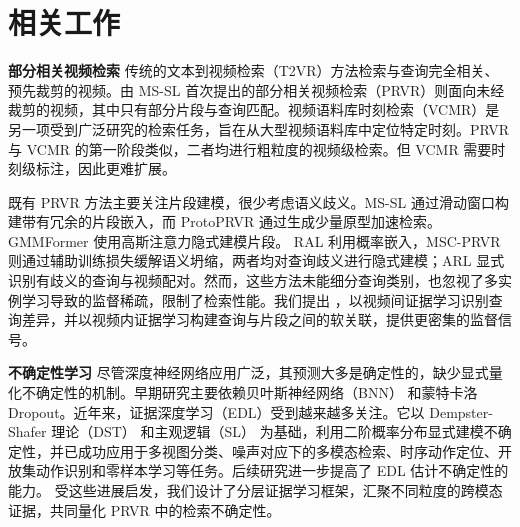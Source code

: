\section{相关工作}
\label{sec:related_works}
\noindent \textbf{部分相关视频检索} \quad
传统的文本到视频检索（T2VR）方法\cite{Video-ColBERT,PIG,BLiM}检索与查询完全相关、预先裁剪的视频。由 MS-SL\cite{ms-sl} 首次提出的部分相关视频检索（PRVR）\cite{dreamprvr,sdm-prvr,bgmnet,amdnet,PEAN}则面向未经裁剪的视频，其中只有部分片段与查询匹配。视频语料库时刻检索（VCMR）\cite{zhang2025video,jsg}是另一项受到广泛研究的检索任务，旨在从大型视频语料库中定位特定时刻。PRVR 与 VCMR 的第一阶段类似，二者均进行粗粒度的视频级检索。但 VCMR 需要时刻级标注，因此更难扩展。

既有 PRVR 方法主要关注片段建模，很少考虑语义歧义。MS-SL\cite{ms-sl,MS-SL++} 通过滑动窗口构建带有冗余的片段嵌入，而 ProtoPRVR\cite{ProtoPRVR} 通过生成少量原型加速检索。GMMFormer\cite{GMMFORMER,GMMFormerV2} 使用高斯注意力隐式建模片段。
RAL\cite{RAL} 利用概率嵌入，MSC-PRVR\cite{msc-prvr} 则通过辅助训练损失缓解语义坍缩，两者均对查询歧义进行隐式建模；ARL\cite{ARL} 显式识别有歧义的查询与视频配对。然而，这些方法未能细分查询类别，也忽视了多实例学习导致的监督稀疏，限制了检索性能。我们提出 \modelname{}，以视频间证据学习识别查询差异，并以视频内证据学习构建查询与片段之间的软关联，提供更密集的监督信号。

\noindent \textbf{不确定性学习} \quad
尽管深度神经网络应用广泛，其预测大多是确定性的，缺少显式量化不确定性的机制。早期研究主要依赖贝叶斯神经网络（BNN）\cite{BNN} 和蒙特卡洛 Dropout\cite{montedropout2}。近年来，证据深度学习（EDL）\cite{edl-2018}受到越来越多关注。它以 Dempster-Shafer 理论（DST）\cite{dst} 和主观逻辑（SL）\cite{sl} 为基础，利用二阶概率分布显式建模不确定性，并已成功应用于多视图分类\cite{tmc,rcml}、噪声对应下的多模态检索\cite{rule,tcl,decl,ugncl,ucpm}、时序动作定位\cite{chenlo1,chenlo2}、开放集动作识别\cite{osa1,osa2}和零样本学习\cite{crest}等任务。后续研究\cite{fisher-edl,r-edl,flex-edl}进一步提高了 EDL 估计不确定性的能力。
受这些进展启发，我们设计了分层证据学习框架，汇聚不同粒度的跨模态证据，共同量化 PRVR 中的检索不确定性。
